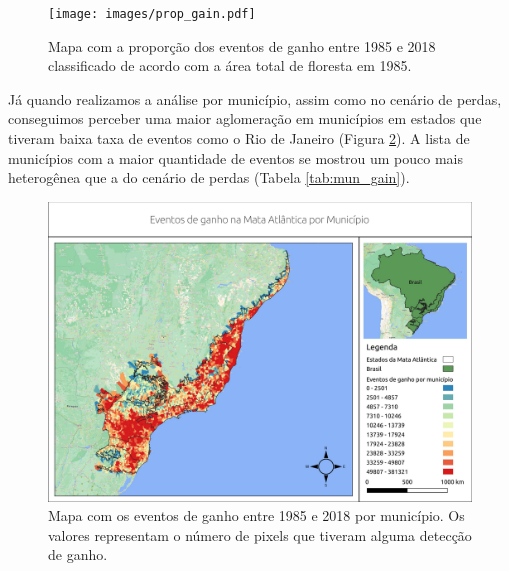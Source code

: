 \begin{figure}[H]
    \centering
    \texttt{[image: images/prop\_gain.pdf]}
    \caption{Mapa com a proporção dos eventos de ganho entre 1985 e 2018 classificado de acordo com a área total de floresta em 1985.}
    \label{fig:prop_gain}
\end{figure}

Já quando realizamos a análise por município, assim como no cenário de perdas, conseguimos perceber uma maior aglomeração em municípios em estados que tiveram baixa taxa de eventos como o Rio de Janeiro (Figura \ref{fig:mun_gain}). A lista de municípios com a maior quantidade de eventos se mostrou um pouco mais heterogênea que a do cenário de perdas (Tabela \ref{tab:mun_gain}). 

\begin{figure}[H]
    \centering
    \includegraphics[scale=.5]{images/mun_gain_seg6_masked18_dur_gt4_inv_for.pdf}
    \caption{Mapa com os eventos de ganho entre 1985 e 2018 por município. Os valores representam o número de pixels que tiveram alguma detecção de ganho.}
    \label{fig:mun_gain}
\end{figure}

